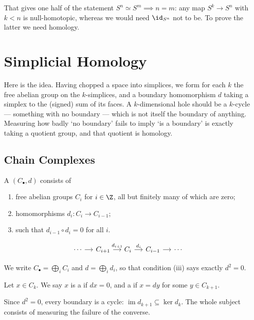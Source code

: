 That gives one half of the statement $S^n \simeq S^m \implies n = m$: any map $S^k \to S^n$
with $k < n$ is null-homotopic, whereas we would need $\id_{S^n}$ not to be. To prove
the latter we need homology.

\section{Simplicial Homology}

Here is the idea. Having chopped a space into simplices, we form for each $k$ the free
abelian group on the $k$-simplices, and a boundary homomorphism $d$ taking a simplex to
the (signed) sum of its faces. A $k$-dimensional hole should be a $k$-cycle --- something
with no boundary --- which is not itself the boundary of anything. Measuring how badly
`no boundary' fails to imply `is a boundary' is exactly taking a quotient group, and that
quotient is homology.

\subsection{Chain Complexes}

\begin{definition}
	A  $(C_\bullet, d)$ consists of
	\begin{enumerate}
		\item free abelian groups $C_i$ for $i \in \Z$, all but finitely many of which are zero;
		\item homomorphisms $d_i: C_i \to C_{i-1}$;
		\item such that $d_{i-1}\circ d_i = 0$ for all $i$.
	\end{enumerate}
	\[\begin{tikzcd}[column sep=small]
		\cdots \arrow[r] & {C_{i+1}} \arrow[r, "{d_{i+1}}"] & {C_i} \arrow[r, "{d_i}"] & {C_{i-1}} \arrow[r] & \cdots
	\end{tikzcd}\]
\end{definition}

We write $C_\bullet = \bigoplus_i C_i$ and $d = \bigoplus_i d_i$, so that condition (iii)
says exactly $d^2 = 0$.

\begin{definition}
	Let $x \in C_k$. We say $x$ is a  if $dx = 0$, and a  if $x = dy$ for some $y \in C_{k+1}$.
\end{definition}

Since $d^2 = 0$, every boundary is a cycle: $\operatorname{im}d_{k+1} \subseteq \ker d_k$.
The whole subject consists of measuring the failure of the converse.

